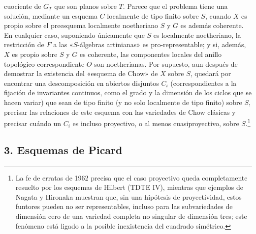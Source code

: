 cuociente de $G_T$ que son planos sobre $T$. Parece que el problema tiene una
solución, mediante un esquema $C$ localmente de tipo finito sobre $S$, cuando
$X$ es propio sobre el preesquema localmente noetheriano $S$ y $G$ es además
coherente. En cualquier caso, suponiendo únicamente que $S$ es localmente
noetheriano, la restricción de $F$ a las «$S$-álgebras artinianas» es
pro-representable; y si, además, $X$ es propio sobre $S$ y $G$ es coherente, las
componentes locales del anillo topológico correspondiente $O$ son
noetherianas. Por supuesto, aun después de demostrar la existencia del
«esquema de Chow» de $X$ sobre $S$, quedará por
encontrar una descomposición en abiertos disjuntos $C_i$ (correspondientes a
la fijación de invariantes continuos, como el grado y la dimensión de los
ciclos que se hacen variar) que sean de tipo finito (y no solo localmente de
tipo finito) sobre $S$, precisar las relaciones de este esquema con las
variedades de Chow clásicas y precisar cuándo un $C_i$ es incluso proyectivo,
o al menos cuasiproyectivo, sobre $S$.\footnote{La fe de erratas de 1962
precisa que el caso proyectivo queda completamente resuelto por los esquemas de
Hilbert (TDTE IV), mientras que ejemplos de Nagata y Hironaka muestran que, sin
una hipótesis de proyectividad, estos funtores pueden no ser representables,
incluso para las subvariedades de dimensión cero de una variedad completa no
singular de dimensión tres; este fenómeno está ligado a la posible
inexistencia del cuadrado simétrico.}

\subsection*{3. Esquemas de Picard}

